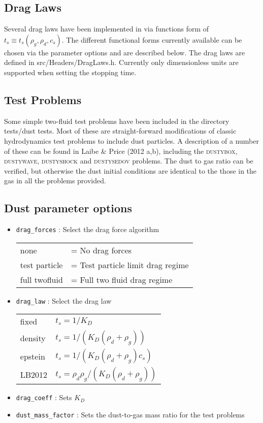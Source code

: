 \documentclass[a4paper]{article}
\newcommand{\var}[1]{\texttt{#1}}
\begin{document}
\subsection{Drag Laws}
Several drag laws have been implemented in via functions form of $t_s \equiv t_s (\rho_g , \rho_d , c_s)$. The different functional forms currently available can be chosen via the parameter options and are described below. The drag laws are defined in src/Headers/DragLaws.h. Currently only dimensionless units are supported when setting the stopping time.

\subsection{Test Problems}
Some simple two-fluid test problems have been included in the directory tests/dust tests. Most of these are straight-forward modifications of classic hydrodynamics test problems to include dust particles. A description of a number of these can be found in Laibe \& Price (2012 a,b), including the \textsc{dustybox}, \textsc{dustywave}, \textsc{dustyshock} and \textsc{dustysedov} problems. The dust to gas ratio can be verified, but otherwise the dust initial conditions are identical to the those in the gas in all the problems provided.

\subsection{Dust parameter options}
\begin{itemize}

\item \var{drag\_forces} : Select the drag force algorithm

\begin{tabular}{ll}
none              & = No drag forces \\
test particle     & = Test particle limit drag regime \\
full twofluid     & = Full two fluid drag regime
\end{tabular} 

\item \var{drag\_law} : Select the drag law

\begin{tabular}{ll}
fixed             & $t_s = 1 / K_D$ \\
density           & $t_s = 1 / (K_D(\rho_d + \rho_g))$ \\
epstein           & $t_s = 1 / (K_D(\rho_d + \rho_g)c_s)$ \\
LB2012            & $t_s = \rho_d \rho_g / (K_D(\rho_d + \rho_g))$ \\
\end{tabular} 

\item \var{drag\_coeff} : Sets $K_D$

\item \var{dust\_mass\_factor} : Sets the dust-to-gas mass ratio for the test problems

\end{itemize}
\end{document}
